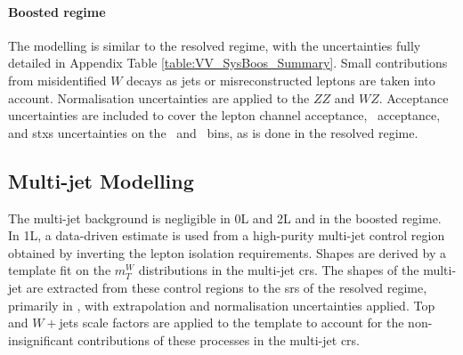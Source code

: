 \paragraph{Boosted regime} The modelling is similar to the resolved regime, with the uncertainties fully detailed in Appendix Table \ref{table:VV_SysBoos_Summary}. Small contributions from misidentified $W$ decays as jets or misreconstructed leptons are taken into account. Normalisation uncertainties are applied to the $ZZ$ and $WZ$. Acceptance uncertainties are included to cover the lepton channel acceptance, \ptv\ acceptance, and \gls{stxs} uncertainties on the \ptv\ and \nj\ bins, as is done in the resolved regime.

\subsection{Multi-jet Modelling}\label{sec-modMultiJ} 
The multi-jet background is negligible in 0L and 2L and in the boosted regime. In 1L, a data-driven estimate is used from a high-purity multi-jet control region obtained by inverting the lepton isolation requirements. Shapes are derived by a template fit on the $m_T^W$ distributions in the multi-jet \glspl{cr}. The shapes of the multi-jet are extracted from these control regions to the \glspl{sr} of the resolved regime, primarily in \vhc, with extrapolation and normalisation uncertainties applied. Top and $W+$jets scale factors are applied to the template to account for the non-insignificant contributions of these processes in the multi-jet \glspl{cr}.